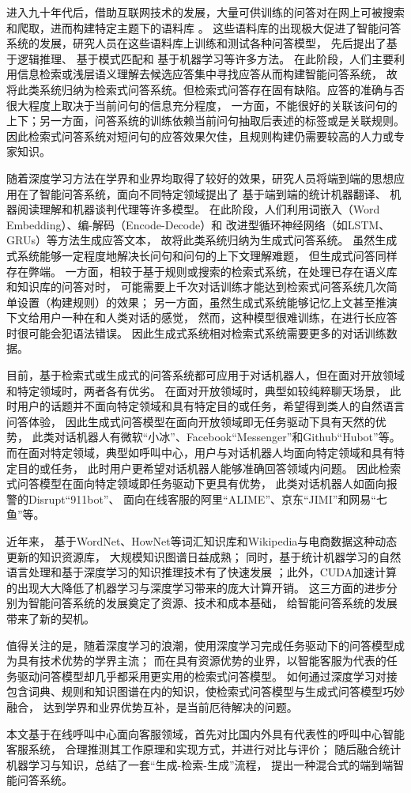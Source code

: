 进入九十年代后，借助互联网技术的发展，大量可供训练的问答对在网上可被搜索和爬取，进而构建特定主题下的语料库
\citep{dang2007overview}。
这些语料库的出现极大促进了智能问答系统的发展，研究人员在这些语料库上训练和测试各种问答模型，
先后提出了基于逻辑推理\citep{moldovan2001logic}、
基于模式匹配\citep{soubbotin2001patterns}和
基于机器学习\citep{yang2002integration}等许多方法。
在此阶段，人们主要利用信息检索或浅层语义理解去候选应答集中寻找应答从而构建智能问答系统，
故将此类系统归纳为检索式问答系统。但检索式问答存在固有缺陷。应答的准确与否很大程度上取决于当前问句的信息充分程度，
一方面，不能很好的关联该问句的上下；另一方面，问答系统的训练依赖当前问句抽取后表述的标签或是关联规则。
因此检索式问答系统对短问句的应答效果欠佳，且规则构建仍需要较高的人力或专家知识。

随着深度学习方法在学界和业界均取得了较好的效果，研究人员将端到端的思想应用在了智能问答系统，面向不同特定领域提出了
基于端到端的统计机器翻译\citep{cho2014learning}、
机器阅读理解\citep{tan2017s}和机器谈判代理\citep{lewis2017s}等许多模型。
在此阶段，人们利用词嵌入（Word Embedding）、编-解码（Encode-Decode）和
改进型循环神经网络（如LSTM、GRUs）等方法生成应答文本，
故将此类系统归纳为生成式问答系统。
虽然生成式系统能够一定程度地解决长问句和问句的上下文理解难题，
但生成式问答同样存在弊端。
一方面，相较于基于规则或搜索的检索式系统，在处理已存在语义库和知识库的问答对时，
可能需要上千次对话训练才能达到检索式问答系统几次简单设置（构建规则）的效果；
另一方面，虽然生成式系统能够记忆上文甚至推演下文\citep{lewis2017s}给用户一种在和人类对话的感觉，
然而，这种模型很难训练，在进行长应答时很可能会犯语法错误。
因此生成式系统相对检索式系统需要更多的对话训练数据。

目前，基于检索式或生成式的问答系统都可应用于对话机器人，但在面对开放领域和特定领域时，两者各有优劣。
在面对开放领域时，典型如较纯粹聊天场景，
此时用户的话题并不面向特定领域和具有特定目的或任务，希望得到类人的自然语言问答体验，
因此生成式问答模型在面向开放领域即无任务驱动下具有天然的优势，
此类对话机器人有微软“小冰”、Facebook“Messenger”和Github“Hubot”等。
而在面对特定领域，典型如呼叫中心，用户与对话机器人均面向特定领域和具有特定目的或任务，
此时用户更希望对话机器人能够准确回答领域内问题。
因此检索式问答模型在面向特定领域即任务驱动下更具有优势，
此类对话机器人如面向报警的Disrupt“911bot”\citep{911bot}、
面向在线客服的阿里“ALIME”\citep{alimi}、京东“JIMI”\citep{jimi}和网易“七鱼”\citep{wangyiqiyu}等。

近年来，
基于WordNet、HowNet等词汇知识库和Wikipedia与电商数据这种动态更新的知识资源库，
大规模知识图谱日益成熟；
同时，基于统计机器学习的自然语言处理和基于深度学习的知识推理技术有了快速发展
；此外，CUDA加速计算的出现大大降低了机器学习与深度学习带来的庞大计算开销。
这三方面的进步分别为智能问答系统的发展奠定了资源、技术和成本基础，
给智能问答系统的发展带来了新的契机。

值得关注的是，随着深度学习的浪潮，使用深度学习完成任务驱动下的问答模型成为具有技术优势的学界主流；
而在具有资源优势的业界，以智能客服为代表的任务驱动问答模型却几乎都采用更实用的检索式问答模型。
如何通过深度学习对接包含词典、规则和知识图谱在内的知识，使检索式问答模型与生成式问答模型巧妙融合，
达到学界和业界优势互补，是当前厄待解决的问题。

本文基于在线呼叫中心面向客服领域，首先对比国内外具有代表性的呼叫中心智能客服系统，
合理推测其工作原理和实现方式，并进行对比与评价；
随后融合统计机器学习与知识，总结了一套“生成-检索-生成”流程，
提出一种混合式的端到端智能问答系统。
